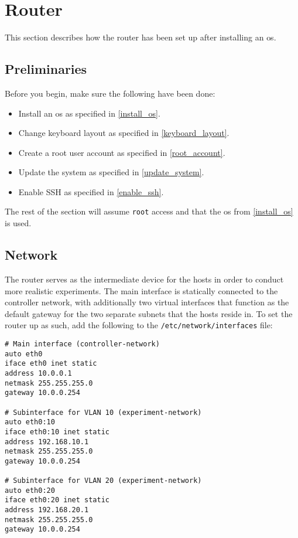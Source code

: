 \chapter{Router}

This section describes how the router has been set up after installing an \gls{os}.

\section{Preliminaries}

Before you begin, make sure the following have been done:

\begin{itemize}
    \item Install an \gls{os} as specified in \ref{install_os}.
    \item Change keyboard layout as specified in \ref{keyboard_layout}.
    \item Create a root user account as specified in \ref{root_account}.
    \item Update the system as specified in \ref{update_system}.
    \item Enable SSH as specified in \ref{enable_ssh}.
\end{itemize}

The rest of the section will assume \lstinline{root} access and that the \gls{os} from \ref{install_os} is used.


\section{Network}

The router serves as the intermediate device for the hosts in order to conduct more realistic experiments. The main interface is statically connected to the controller network, with additionally two virtual interfaces that function as the default gateway for the two separate subnets that the hosts reside in. To set the router up as such, add the following to the \lstinline{/etc/network/interfaces} file:

\begin{verbatim}
# Main interface (controller-network)
auto eth0
iface eth0 inet static
address 10.0.0.1
netmask 255.255.255.0
gateway 10.0.0.254

# Subinterface for VLAN 10 (experiment-network)
auto eth0:10
iface eth0:10 inet static
address 192.168.10.1
netmask 255.255.255.0
gateway 10.0.0.254

# Subinterface for VLAN 20 (experiment-network)
auto eth0:20
iface eth0:20 inet static
address 192.168.20.1
netmask 255.255.255.0
gateway 10.0.0.254
\end{verbatim}

